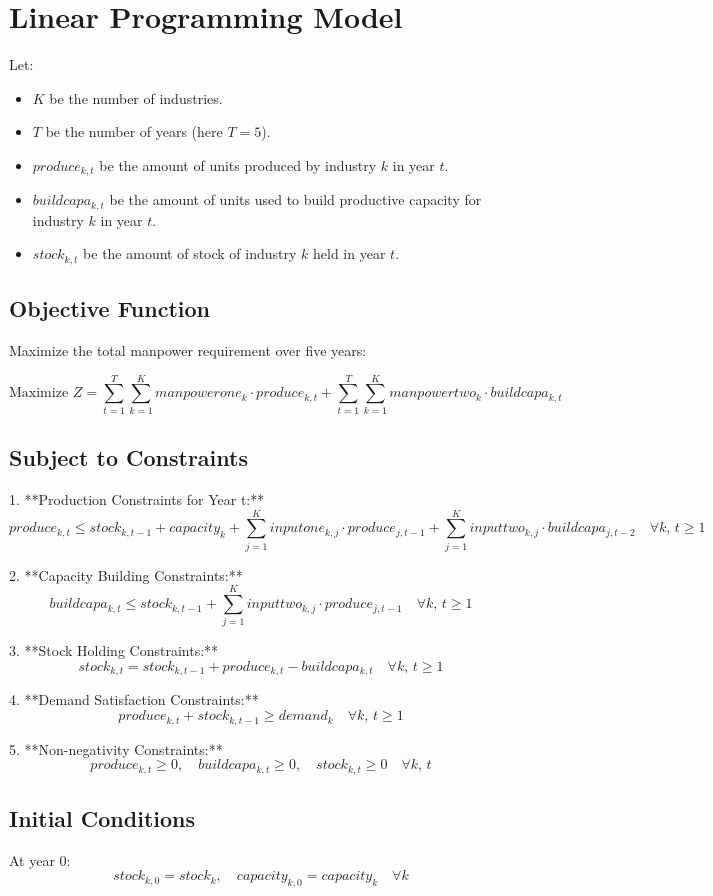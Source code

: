 \documentclass{article}
\begin{document}
\section*{Linear Programming Model}

Let:
\begin{itemize}
    \item \( K \) be the number of industries.
    \item \( T \) be the number of years (here \( T = 5 \)).
    \item \( produce_{k, t} \) be the amount of units produced by industry \( k \) in year \( t \).
    \item \( buildcapa_{k, t} \) be the amount of units used to build productive capacity for industry \( k \) in year \( t \).
    \item \( stock_{k, t} \) be the amount of stock of industry \( k \) held in year \( t \).
\end{itemize}

\subsection*{Objective Function}
Maximize the total manpower requirement over five years:

\[
\text{Maximize } Z = \sum_{t=1}^{T} \sum_{k=1}^{K} manpowerone_{k} \cdot produce_{k, t} + \sum_{t=1}^{T} \sum_{k=1}^{K} manpowertwo_{k} \cdot buildcapa_{k, t}
\]

\subsection*{Subject to Constraints}

1. **Production Constraints for Year t:**
   \[
   produce_{k, t} \leq stock_{k, t-1} + capacity_{k} + \sum_{j=1}^{K} inputone_{k, j} \cdot produce_{j, t-1} + \sum_{j=1}^{K} inputtwo_{k, j} \cdot buildcapa_{j, t-2} \quad \forall k, \, t \geq 1
   \]

2. **Capacity Building Constraints:**
   \[
   buildcapa_{k, t} \leq stock_{k, t-1} + \sum_{j=1}^{K} inputtwo_{k, j} \cdot produce_{j, t-1} \quad \forall k, \, t \geq 1
   \]

3. **Stock Holding Constraints:**
   \[
   stock_{k, t} = stock_{k, t-1} + produce_{k, t} - buildcapa_{k, t} \quad \forall k, \, t \geq 1
   \]

4. **Demand Satisfaction Constraints:**
   \[
   produce_{k, t} + stock_{k, t-1} \geq demand_{k} \quad \forall k, \, t \geq 1
   \]

5. **Non-negativity Constraints:**
   \[
   produce_{k, t} \geq 0, \quad buildcapa_{k, t} \geq 0, \quad stock_{k, t} \geq 0 \quad \forall k, \, t
   \]

\subsection*{Initial Conditions}
At year \( 0 \):
\[
stock_{k, 0} = stock_{k}, \quad capacity_{k, 0} = capacity_{k} \quad \forall k
\]
\end{document}
